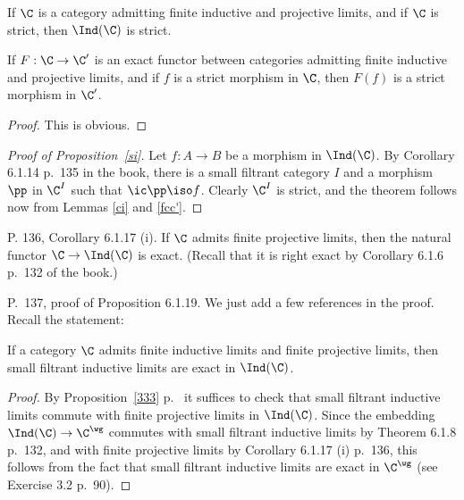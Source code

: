 \documentclass[12pt]{article}
\theoremstyle{remark}
\theoremstyle{definition}
\begin{document}
\begin{s}

\begin{prop} 
If $\C$ is a category admitting finite inductive and projective limits, and if $\C$ is strict, then $\Ind(\C)$ is strict. 
\end{prop} 

\begin{lem} 
If $F:\C\to\C'$ is an exact functor between categories admitting finite inductive and projective limits, and if $f$ is a strict morphism in $\C$, then $F(f)$ is a strict morphism in $\C'$. 
\end{lem}

\begin{proof} 
This is obvious. 
\end{proof} 

\begin{proof}[Proof of Proposition~\ref{si}] 
Let $f:A\to B$ be a morphism in $\Ind(\C)$. By Corollary 6.1.14 p.~135 in the book, there is a small filtrant category $I$ and a morphism $\pp$ in $\C^I$ such that $\ic\pp\iso f$. Clearly $\C^I$ is strict, and the theorem follows now from Lemmas \ref{ci} and \ref{fcc'}. 
\end{proof}

\end{s}

%

\begin{s}
P. 136, Corollary 6.1.17 (i). If $\C$ admits finite projective limits, then the natural functor $\C\to\Ind(\C)$ is exact. (Recall that it is right exact by Corollary 6.1.6 p.~132 of the book.)%
\end{s}

% 

\begin{s} 
P.~137, proof of Proposition 6.1.19. We just add a few references in the proof. Recall the statement:
\begin{prop}
If a category $\C$ admits finite inductive limits and finite projective limits, then small filtrant inductive limits are exact in $\Ind(\C)$.
\end{prop}
\begin{proof}
By Proposition~\ref{333} p.~ it suffices to check that small filtrant inductive limits commute with finite projective limits in $\Ind(\C)$. Since the embedding $\Ind(\C)\to\C^\wg$ commutes with small filtrant inductive limits by Theorem 6.1.8 p.~132, and with finite projective limits by Corollary 6.1.17 (i) p.~136, this follows from the fact that small filtrant inductive limits are exact in $\C^\wg$ (see Exercise 3.2 p.~90).
\end{proof}
\end{s}
\end{document}
